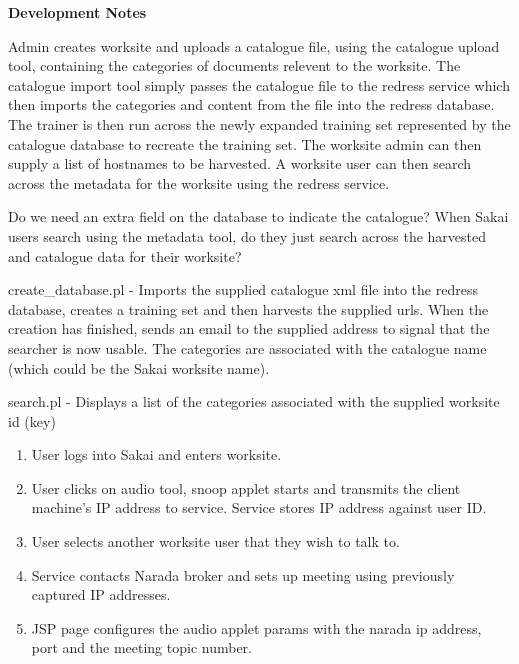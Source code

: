 \documentclass[11pt,a4]{article}
\begin{document}
\pagestyle{headings}
    
\begin{center}
{\Large \bf Development Notes}
\end{center}

Admin creates worksite and uploads a catalogue file, using the catalogue upload
tool, containing the categories of documents relevent to the worksite. The
catalogue import tool simply passes the catalogue file to the redress service
which then imports the categories and content from the file into the redress
database. The trainer is then run across the newly expanded training set
represented by the catalogue database to recreate the training set. The worksite
admin can then supply a list of hostnames to be harvested. A worksite user can
then search across the metadata for the worksite using the redress service.

Do we need an extra field on the database to indicate the catalogue? When Sakai
users search using the metadata tool, do they just search across the harvested
and catalogue data for their worksite?

create\_database.pl - Imports the supplied catalogue xml file into the redress
database, creates a training set and then harvests the supplied urls. When the
creation has finished, sends an email to the supplied address to signal that
the searcher is now usable. The categories are associated with the catalogue
name (which could be the Sakai worksite name).

search.pl - Displays a list of the categories associated with the supplied
worksite id (key)

\begin{enumerate}
\item User logs into Sakai and enters worksite.
\item User clicks on audio tool, snoop applet starts and transmits the client
machine's IP address to service. Service stores IP address against user
ID.
\item User selects another worksite user that they wish to talk to.
\item Service contacts Narada broker and sets up meeting using previously
captured IP addresses.
\item JSP page configures the audio applet params with the
narada ip address, port and the meeting topic number.
\end{enumerate}

\hline
\end{document}
